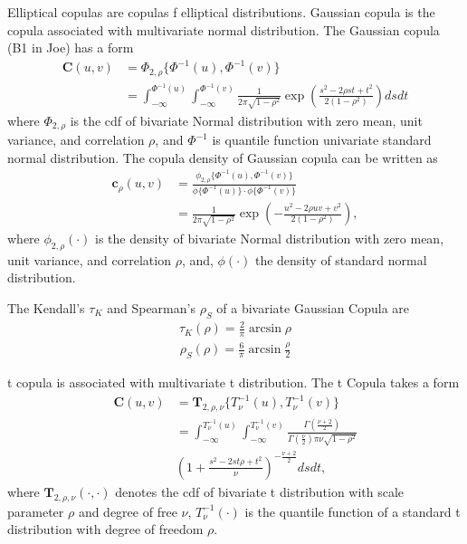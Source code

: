 \documentclass[square]{article} %
\begin{document}
    Elliptical copulas are copulas f elliptical distributions.
    Gaussian copula is the copula associated with multivariate normal distribution.
    The Gaussian copula (B1 in Joe) has a form
        \begin{align}
            \bm{C}(u,v) &= \Phi_{2, \rho}\{\Phi^{-1}(u), \Phi^{-1}(v)\} \\
                        &= \int_{-\infty}^{\Phi^{-1}(u)}
                           \int_{-\infty}^{\Phi^{-1}(v)}
                           \frac{1}{2\pi\sqrt{1-\rho^2}}
                           \exp{\left(
                           \frac{s^2-2\rho st+t^2}{2(1-\rho^2)}
                           \right)} ds dt
            \end{align}
    where $\Phi_{2, \rho}$ is the cdf of bivariate Normal distribution with zero mean, unit variance, and correlation $\rho$,
    and $\Phi^{-1}$ is quantile function univariate standard normal distribution.
    The copula density of Gaussian copula can be written as
    \begin{align}
        \bm{c}_\rho(u,v) &= \frac{\phi_{2,\rho}\{\Phi^{-1}(u), \Phi^{-1}(v)\}}
                            {\phi\{\Phi^{-1}(u)\} \cdot \phi\{\Phi^{-1}(v)\}}\\
                    &= \frac{1}{2\pi\sqrt{1-\rho^2}}\exp\left(
                       -\frac{u^2 - 2\rho uv + v^2}{2(1-\rho^2)}
                       \right) ,
        \end{align}
    where $\phi_{2,\rho}(\cdot)$ is the density of bivariate Normal distribution with zero mean,
    unit variance,
    and correlation $\rho$,
    and, $\phi(\cdot)$ the density of standard normal distribution.

    The Kendall's $\tau_K$ and Spearman's $\rho_S$ of a bivariate Gaussian Copula are
        \begin{align}
            \tau_K(\rho) = \frac{2}{\pi}\arcsin\rho
            \end{align}
        \begin{align}
            \rho_S(\rho) = \frac{6}{\pi}\arcsin\frac{\rho}{2}
            \end{align}

    t copula is associated with multivariate t distribution.
    The t Copula takes a form
    \begin{align}
            \bm{C}(u,v) &= \bm{T}_{2, \rho, \nu}\{T^{-1}_\nu(u), T^{-1}_\nu(v)\} \\
                &= \int_{-\infty}^{T^{-1}_\nu(u)}
                   \int_{-\infty}^{T^{-1}_\nu(v)}
                \frac{\Gamma\left(\frac{\nu+2}{2}\right)}
                {\Gamma\left(\frac{\nu}{2}\right)\pi\nu\sqrt{1-\rho^2}}\\
               & \left(
            1+\frac{s^2-2st\rho+t^2}{\nu}
            \right)^{-\frac{\nu+2}{2}} ds dt,
        \end{align}
    where $\bm{T}_{2, \rho, \nu}(\cdot, \cdot)$ denotes the cdf of bivariate t distribution with scale parameter $\rho$ and degree of free $\nu$,
    $T^{-1}_\nu(\cdot)$ is the quantile function of a standard t distribution with degree of freedom $\rho$.
\end{document}

